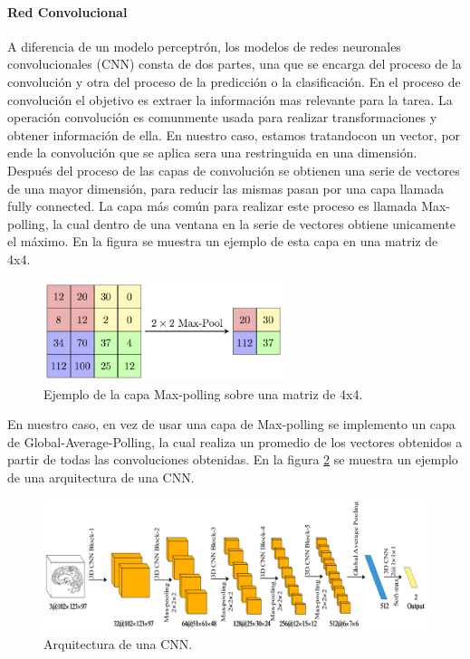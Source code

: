 \paragraph{Red Convolucional}
A diferencia de un modelo perceptrón, los modelos de redes neuronales convolucionales (CNN) consta de dos partes, una que se encarga del proceso de la convolución y otra del proceso de la predicción o la clasificación. En el proceso de convolución el objetivo es extraer la información mas relevante para la tarea. La operación convolución es comunmente usada para realizar transformaciones y obtener información de ella\cite{Unser_1995,Boellaard_1997,Hang_Gao_2009}. En nuestro caso, estamos tratandocon un vector, por ende la convolución que se aplica sera una restringuida en una dimensión. Después del proceso de las capas de convolución se obtienen una serie de vectores de una mayor dimensión, para reducir las mismas pasan por una capa llamada fully connected. La capa más común para realizar este proceso es llamada Max-polling, la cual dentro de una ventana en la serie de vectores obtiene unicamente el máximo. En la figura se muestra un ejemplo de esta capa en una matriz de 4x4.
\begin{figure}[H]
	\centering
	\includegraphics[width=7cm]{Graphics/maxpolling.png}
	\caption{Ejemplo de la capa Max-polling sobre una matriz de 4x4\cite{max_polling_image}.}
	\label{fig:maxpolling}
\end{figure}
En nuestro caso, en vez de usar una capa de Max-polling se implemento un capa de Global-Average-Polling\cite{min_2013}, la cual realiza un promedio de los vectores obtenidos a partir de todas las convoluciones obtenidas. En la figura \ref{fig:cnn} se muestra un ejemplo de una arquitectura de una CNN.
\begin{figure}[H]
	\centering
	\includegraphics[width=14cm]{Graphics/cnn.png}
	\caption{Arquitectura de una CNN\cite{Qu_2020}.}
	\label{fig:cnn}
\end{figure}
